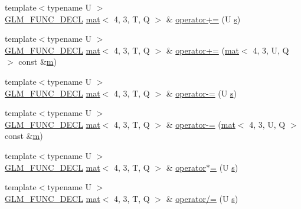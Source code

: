 \begin{DoxyCompactItemize}
\item 
{\footnotesize template$<$typename U $>$ }\\\hyperlink{setup_8hpp_ab2d052de21a70539923e9bcbf6e83a51}{G\+L\+M\+\_\+\+F\+U\+N\+C\+\_\+\+D\+E\+CL} \hyperlink{structglm_1_1mat}{mat}$<$ 4, 3, T, Q $>$ \& \hyperlink{structglm_1_1mat_3_014_00_013_00_01_t_00_01_q_01_4_afd8c591747fffe69889f28170bf76294}{operator+=} (U \hyperlink{_s_d_l__opengl_8h_a4af680a6c683f88ed67b76f207f2e6e4}{s})
\item 
{\footnotesize template$<$typename U $>$ }\\\hyperlink{setup_8hpp_ab2d052de21a70539923e9bcbf6e83a51}{G\+L\+M\+\_\+\+F\+U\+N\+C\+\_\+\+D\+E\+CL} \hyperlink{structglm_1_1mat}{mat}$<$ 4, 3, T, Q $>$ \& \hyperlink{structglm_1_1mat_3_014_00_013_00_01_t_00_01_q_01_4_aa7b86eac813820bbca325d7ac853e612}{operator+=} (\hyperlink{structglm_1_1mat}{mat}$<$ 4, 3, U, Q $>$ const \&\hyperlink{_s_d_l__opengl__glext_8h_af593500c283bf1a787a6f947f503a5c2}{m})
\item 
{\footnotesize template$<$typename U $>$ }\\\hyperlink{setup_8hpp_ab2d052de21a70539923e9bcbf6e83a51}{G\+L\+M\+\_\+\+F\+U\+N\+C\+\_\+\+D\+E\+CL} \hyperlink{structglm_1_1mat}{mat}$<$ 4, 3, T, Q $>$ \& \hyperlink{structglm_1_1mat_3_014_00_013_00_01_t_00_01_q_01_4_a88092ec48acadaf5147db1f4d9fdd964}{operator-\/=} (U \hyperlink{_s_d_l__opengl_8h_a4af680a6c683f88ed67b76f207f2e6e4}{s})
\item 
{\footnotesize template$<$typename U $>$ }\\\hyperlink{setup_8hpp_ab2d052de21a70539923e9bcbf6e83a51}{G\+L\+M\+\_\+\+F\+U\+N\+C\+\_\+\+D\+E\+CL} \hyperlink{structglm_1_1mat}{mat}$<$ 4, 3, T, Q $>$ \& \hyperlink{structglm_1_1mat_3_014_00_013_00_01_t_00_01_q_01_4_aafef14a762200cd1cbba9abb1d366d75}{operator-\/=} (\hyperlink{structglm_1_1mat}{mat}$<$ 4, 3, U, Q $>$ const \&\hyperlink{_s_d_l__opengl__glext_8h_af593500c283bf1a787a6f947f503a5c2}{m})
\item 
{\footnotesize template$<$typename U $>$ }\\\hyperlink{setup_8hpp_ab2d052de21a70539923e9bcbf6e83a51}{G\+L\+M\+\_\+\+F\+U\+N\+C\+\_\+\+D\+E\+CL} \hyperlink{structglm_1_1mat}{mat}$<$ 4, 3, T, Q $>$ \& \hyperlink{structglm_1_1mat_3_014_00_013_00_01_t_00_01_q_01_4_a023bcd2ba77d740cdc63219227571aca}{operator$\ast$=} (U \hyperlink{_s_d_l__opengl_8h_a4af680a6c683f88ed67b76f207f2e6e4}{s})
\item 
{\footnotesize template$<$typename U $>$ }\\\hyperlink{setup_8hpp_ab2d052de21a70539923e9bcbf6e83a51}{G\+L\+M\+\_\+\+F\+U\+N\+C\+\_\+\+D\+E\+CL} \hyperlink{structglm_1_1mat}{mat}$<$ 4, 3, T, Q $>$ \& \hyperlink{structglm_1_1mat_3_014_00_013_00_01_t_00_01_q_01_4_ae0dcc6b5b5a3d7aee42092985a16aeb6}{operator/=} (U \hyperlink{_s_d_l__opengl_8h_a4af680a6c683f88ed67b76f207f2e6e4}{s})

\end{DoxyCompactItemize}
